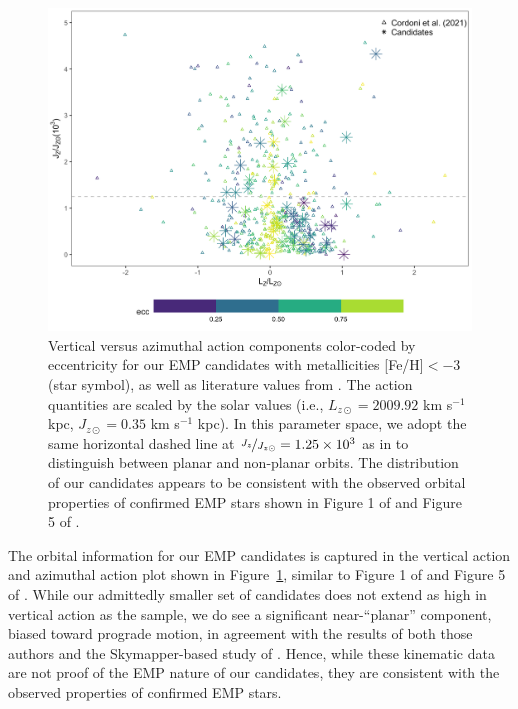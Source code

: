 \documentclass[]{aastex631}
\newcommand{\feh}{[Fe/H]\xspace}
\begin{document}
\begin{figure}
\includegraphics[width=\linewidth]{Plots/Figure14.png}
\caption{Vertical versus azimuthal action components color-coded by eccentricity for our EMP candidates with metallicities \feh $<-3$ (star symbol), as well as literature values from \citet[][triangle symbol]{Cordoni2021}. The action quantities are scaled by the solar values
(i.e.,  $L_{z \odot}=2009.92$ km s$^{−1}$ kpc, $J_{z \odot} =0.35$ km s$^{−1}$ kpc). In this parameter space, we adopt the same horizontal dashed line at $ \nicefrac {J_{z}}{J_{z \odot}} =1.25 \times 10^{3}$ as in \citet{Cordoni2021} to distinguish between planar and non-planar orbits. The distribution of our candidates appears to be consistent with the observed orbital properties of confirmed EMP stars shown in Figure 1 of \citet{Sestito2020} and Figure 5 of \citet{Cordoni2021}.}
\label{fig:candidate_orbitals}
\end{figure}

The orbital information for our EMP candidates is captured in the vertical action and azimuthal action plot shown in Figure~\ref{fig:candidate_orbitals}, similar to Figure 1 of \citet{Sestito2020} and Figure 5 of \citet{Cordoni2021}. While our admittedly smaller set of candidates does not extend as high in vertical action as the \citet{Sestito2020} sample, we do see a significant near-``planar'' component, biased toward prograde motion, in agreement with the results of both those authors and the Skymapper-based study of \citet{Cordoni2021}. Hence, while these kinematic data are not proof of the EMP nature of our candidates, they are consistent with the observed properties of confirmed EMP stars. 
\end{document}
